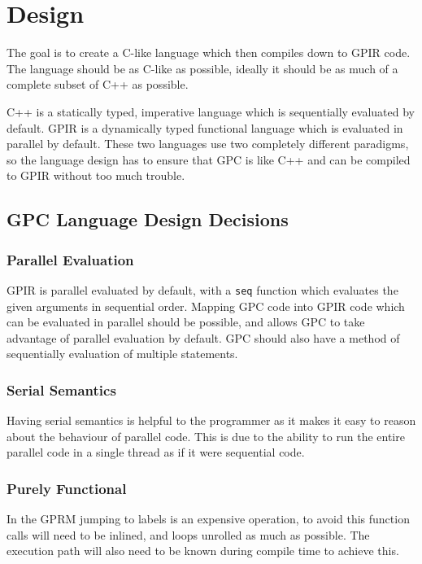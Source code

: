 \chapter{Design}

The goal is to create a C-like language which then compiles down to GPIR code.
The language should be as C-like as possible, ideally it should be as much
of a complete subset of C++ as possible.

C++ is a statically typed, imperative language which is sequentially evaluated by default.
GPIR is a dynamically typed functional language which is evaluated in parallel by default.
These two languages use two completely different paradigms, so the language design has to 
ensure that GPC is like C++ and can be compiled to GPIR without too much trouble.

\section{GPC Language Design Decisions}
\label{sec:Lang}

\subsection{Parallel Evaluation}
GPIR is parallel evaluated by default, with a \texttt{seq} function which
evaluates the given arguments in sequential order. Mapping GPC code into
GPIR code which can be evaluated in parallel should be possible, and allows
GPC to take advantage of parallel evaluation by default. GPC should also
have a method of sequentially evaluation of multiple statements.


\subsection{Serial Semantics}
Having serial semantics is helpful to the programmer as it makes
it easy to reason about the behaviour of parallel code.
This is due to the ability to run the entire parallel code in a single
thread as if it were sequential code. 

\subsection{Purely Functional}

In the GPRM jumping to labels is an expensive operation, to avoid
this function calls will need to be inlined, and loops unrolled 
as much as possible. The execution path will also need to be known 
during compile time to achieve this. 

